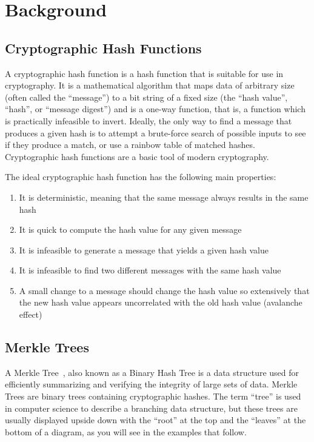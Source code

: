 \chapter{Background}

\section{Cryptographic Hash Functions}

A cryptographic hash function is a hash function that is suitable for use
in cryptography. It is a mathematical algorithm that maps data of arbitrary
size (often called the ``message'') to a bit string of a fixed size (the ``hash
value'', ``hash'', or ``message digest'') and is a one-way function, that is, a
function which is practically infeasible to invert. Ideally, the only way to
find a message that produces a given hash is to attempt a brute-force search of
possible inputs to see if they produce a match, or use a rainbow table of
matched hashes. Cryptographic hash functions are a basic tool of modern
cryptography.

\noindent
The ideal cryptographic hash function has the following main properties:

\begin{enumerate}
\item It is deterministic, meaning that the same message always results in the same hash
\item It is quick to compute the hash value for any given message
\item It is infeasible to generate a message that yields a given hash value
\item It is infeasible to find two different messages with the same hash value
\item A small change to a message should change the hash value so extensively that the new hash value appears uncorrelated with the old hash value (avalanche effect)
\end{enumerate}

\section{Merkle Trees}

A Merkle Tree~\cite{merkle}, also known as a Binary Hash Tree is a data structure used for
efficiently summarizing and verifying the integrity of large sets of data.
Merkle Trees are binary trees containing cryptographic hashes. The term
``tree'' is used in computer science to describe a branching data structure,
but these trees are usually displayed upside down with the ``root'' at the top
and the ``leaves'' at the bottom of a diagram, as you will see in the examples
that follow.

